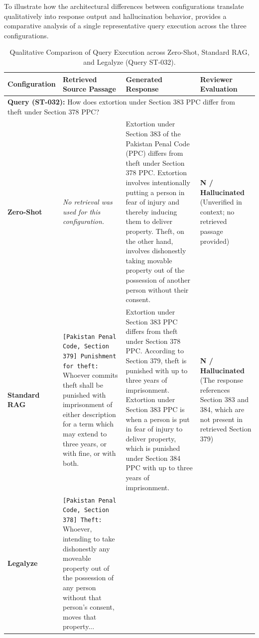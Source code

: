 To illustrate how the architectural differences between configurations translate qualitatively into response output and hallucination behavior,  provides a comparative analysis of a single representative query execution across the three configurations.

\begin{table}[t]
\caption{Qualitative Comparison of Query Execution across Zero-Shot, Standard RAG, and Legalyze (Query ST-032).}
\label{tab:sample_comparison}
\centering
\small
\begin{tabularx}{\textwidth}{|l|>{\raggedright\arraybackslash\hsize=1.1\hsize}X|>{\raggedright\arraybackslash\hsize=1.1\hsize}X|>{\raggedright\arraybackslash\hsize=0.8\hsize}X|}
\hline
\textbf{Configuration} & \textbf{Retrieved Source Passage} & \textbf{Generated Response} & \textbf{Reviewer Evaluation} \\ \hline
\multicolumn{4}{|l|}{\textbf{Query (ST-032):} How does extortion under Section 383 PPC differ from theft under Section 378 PPC?} \\ \hline
\textbf{Zero-Shot} & 
\emph{No retrieval was used for this configuration.} & 
Extortion under Section 383 of the Pakistan Penal Code (PPC) differs from theft under Section 378 PPC. Extortion involves intentionally putting a person in fear of injury and thereby inducing them to deliver property. Theft, on the other hand, involves dishonestly taking movable property out of the possession of another person without their consent. & 
\textbf{N / Hallucinated} \newline (Unverified in context; no retrieved passage provided) \\ \hline
\textbf{Standard RAG} & 
\texttt{[Pakistan Penal Code, Section 379] Punishment for theft:} Whoever commits theft shall be punished with imprisonment of either description for a term which may extend to three years, or with fine, or with both. & 
Extortion under Section 383 PPC differs from theft under Section 378 PPC. According to Section 379, theft is punished with up to three years of imprisonment. Extortion under Section 383 PPC is when a person is put in fear of injury to deliver property, which is punished under Section 384 PPC with up to three years of imprisonment. & 
\textbf{N / Hallucinated} \newline (The response references Section 383 and 384, which are not present in retrieved Section 379) \\ \hline
\textbf{Legalyze} & 
\texttt{[Pakistan Penal Code, Section 378] Theft:} Whoever, intending to take dishonestly any moveable property out of the possession of any person without that person's consent, moves that property... \newline

\end{tabularx}
\end{table}
